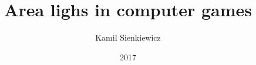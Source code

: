 \documentclass[pl]{minipw/minipw}
\title{Area lighs in computer games}
\author{Kamil Sienkiewicz}
\date{2017}
\begin{document}
\sloppy
\setcounter{page}{1}




\cleardoublepage
\tableofcontents

\listoftodos

\cleardoublepage
\pagestyle{fancy}

%




\begin{appendices}

\end{appendices}



\end{document}
